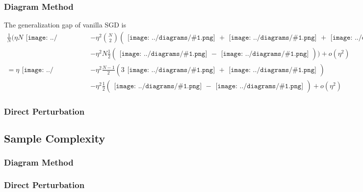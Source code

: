 \documentclass{article}
\newcommand{\wrap}[1]{\left( #1 \right)}
\newcommand{\sdia}[1]{\begin{gathered}\texttt{[image: ../diagrams/\#1.png]}\end{gathered}}
\begin{document}
        \subsubsection*{Diagram Method}
            The generalization gap of vanilla SGD is 
            \begin{align*}
                \frac{1}{N} (
                \eta N \sdia{c(01)(01)} 
                &-
                \eta^2 {N \choose 2} \wrap{
                    \sdia{c(0-12)(01-12)} + 
                    \sdia{c(02-1)(01-12)} + 
                    \sdia{c(0-12)(02-12)} + 
                    \sdia{c(02-1)(02-12)}   
                } \\
                &- 
                \eta^2 N \frac{1}{2} \wrap{
                    \sdia{(012)(02-12)} -
                    \sdia{(01-2)(02-12)}
                })
                + o(\eta^2) \\
                =
                \eta \sdia{c(01)(01)} 
                &-
                \eta^2 \frac{N-1}{2} \wrap{
                    3\sdia{c(0-12)(01-12)} + 
                    \sdia{c(02-1)(01-12)} 
                } \\
                &- 
                \eta^2 \frac{1}{2} \wrap{
                    \sdia{(012)(02-12)} -
                    \sdia{(01-2)(02-12)}
                }
                + o(\eta^2)
            \end{align*}

        \subsubsection*{Direct Perturbation}

    \subsection*{Sample Complexity}
        \subsubsection*{Diagram Method}
        \subsubsection*{Direct Perturbation}
\end{document}
